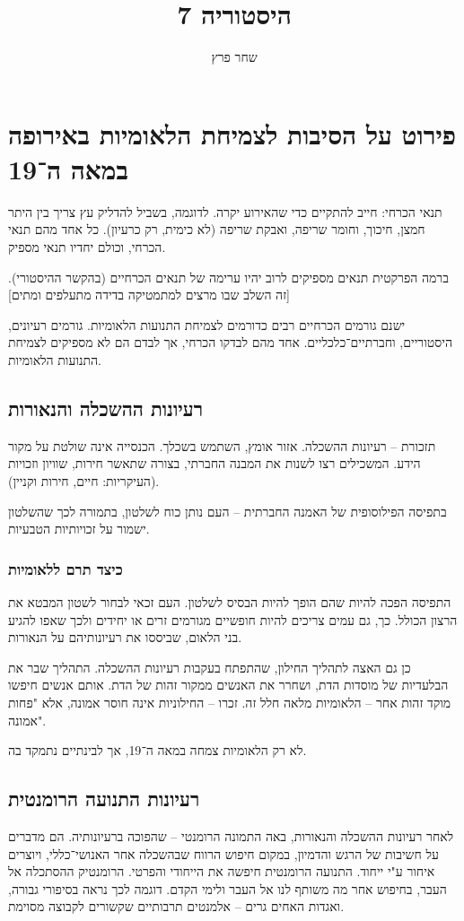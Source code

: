 \documentclass[]{article}
\author{שחר פרץ}
\title{היסטוריה 7}
\begin{document}
	\maketitle
	\section{פירוט על הסיבות לצמיחת הלאומיות באירופה במאה ה־19}
	תנאי הכרחי: חייב להתקיים כדי שהאירוע יקרה.
	לדוגמה, בשביל להדליק עץ צריך בין היתר חמצן, חיכוך, וחומר שריפה, ואבקת שריפה (לא כימית, רק כרעיון). כל אחד מהם תנאי הכרחי, וכולם יחדיו תנאי מספיק. 
	
	ברמה הפרקטית תנאים מספיקים לרוב יהיו ערימה של תנאים הכרחיים (בהקשר ההיסטורי). [זה השלב שבו מרצים למתמטיקה בדידה מתעלפים ומתים]
	
	ישנם גורמים הכרחיים רבים כדורמים לצמיחת התנועות הלאומיות. גורמים רעיונים, היסטוריים, וחברתיים־כלכליים. אחד מהם לבדקו הכרחי, אך לבדם הם לא מספיקים לצמיחת התנועות הלאומיות. 
	\subsection{רעיונות ההשכלה והנאורות}
	תזכורת – רעיונות ההשכלה. אזור אומץ, השתמש בשכלך. הכנסייה אינה שולטת על מקור הידע. המשכילים רצו לשנות את המבנה החברתי, בצורה שתאשר חירות, שוויון וזכויות (העיקריות: חיים, חירות וקניין). 
	
	בתפיסה הפילוסופית של האמנה החברתית – העם נותן כוח לשלטון, בתמורה לכך שהשלטון ישמור על זכויותיות הטבעיות. 
	\subsubsection{כיצד תרם ללאומיות}
	התפיסה הפכה להיות שהם הופך להיות הבסיס לשלטון. העם זכאי לבחור לשטון המבטא את הרצון הכולל. כך, גם עמים צריכים להיות חופשיים מגורמים זרים או יחידים ולכך שאפו להגיע בני הלאום, שביססו את רעיונותיהם על הנאורות. 
	
	כן גם האצה לתהליך החילון, שהתפתח בעקבות רעיונות ההשכלה. התהליך שבר את הבלעדיות של מוסדות הדת, ושחרר את האנשים ממקור זהות של הדת. אותם אנשים חיפשו מוקד זהות אחר – הלאומיות מלאה חלל זה. זכרו – החילוניות אינה חוסר אמונה, אלא "פחות אמונה". 
	
	לא רק הלאומיות צמחה במאה ה־19, אך לבינתיים נתמקד בה. 
	
	\subsection{רעיונות התנועה הרומנטית}
	לאחר רעיונות ההשכלה והנאורות, באה התמונה הרומנטי – שהפוכה ברעיונותיה. הם מדברים על חשיבות של הרגש והדמיון, במקום חיפוש הרווח שבהשכלה אחר האנושי־כללי, ויוצרים איחור ע"י ייחוד. התנועה הרומנטית חיפשה את הייחודי והפרטי. הרומנטיק ההסתכלה אל העבר, בחיפוש אחר מה משותף לנו אל העבר ולימי הקדם. דוגמה לכך נראה בסיפורי גבורה, ואגדות האחים גרים – אלמנטים תרבותיים שקשורים לקבוצה מסוימת. 
	
\end{document}
